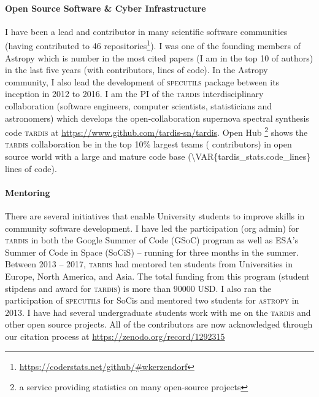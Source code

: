 \documentclass[10pt]{article}
\begin{document}
\paragraph{Open Source Software \& Cyber Infrastructure} I have been a lead and contributor in many scientific software communities (having contributed to 46 repositories\footnote{\url{https://coderstats.net/github/\#wkerzendorf}}). I was one of the founding members of Astropy which is number 
\textbf{} in the most cited papers (I am in the top 10 of authors) in the last five years (with  contributors,  lines of code).
 In the Astropy community, I also lead the development of \textsc{specutils} package between its inception in 2012 to 2016. 
I am the PI of the \textsc{tardis} interdisciplinary collaboration (software engineers, computer scientists, statisticians and astronomers) which develops the open-collaboration supernova spectral synthesis code \textsc{tardis} at \url{https://www.github.com/tardis-sn/tardis}. Open Hub \footnote{a service providing statistics on many open-source projects} shows the \textsc{tardis} collaboration be in the top 10\% largest teams ( contributors) in open source world with a large and mature code base (\num{\VAR{tardis_stats.code_lines}} lines of code). 


\paragraph{Mentoring}
There are several initiatives that enable University students to improve skills in community software development. I have led the participation (org admin) for \textsc{tardis} in both the Google Summer of Code (GSoC) program as well as ESA's Summer of Code in Space (SoCiS) -- running for three months in the summer. Between 2013 -- 2017, \textsc{tardis} had mentored ten students from Universities in Europe, North America, and Asia. The total funding from this program (student stipdens and award for \textsc{tardis}) is more than \num{90000} USD. 
I also ran the participation of \textsc{specutils} for SoCis and mentored two students for \textsc{astropy} in 2013. 
I have had several undergraduate students work with me on the \textsc{tardis} and other open source projects. All of the contributors are now acknowledged through our citation process at 
\url{https://zenodo.org/record/1292315}
\end{document}
